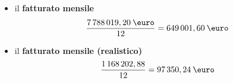 \begin{itemize}
\item il \textbf{fatturato mensile}
	\begin{equation}
	\label{eq:fatturato_teorico_anno_netto}
	\begin{split}
		\frac{7\thinspace 788\thinspace 019,20 \: \mbox{\euro}}{12} = 649\thinspace 001,60 \: \mbox{\euro} 
	\end{split}
	\end{equation}	

	
\item il \textbf{fatturato mensile (realistico)} 
	\begin{equation}
	\label{eq:fatturato_mensile_netto}
	\begin{split}
		\frac{1\thinspace 168\thinspace 202,88}{12} = 97\thinspace 350,24 \: \mbox{\euro}
	\end{split}
	\end{equation}
	
\end{itemize}